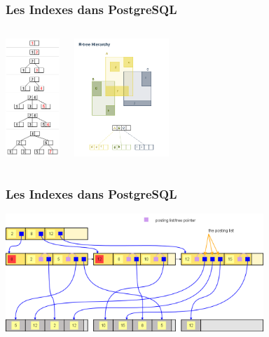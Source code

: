 \documentclass{beamer}
\begin{document}
\begin{frame}
  \frametitle{Les Indexes dans PostgreSQL}

  \begin{columns}
    \begin{center}
      \includegraphics[height=12em]{B_tree_insertion_example.png}
    \end{center}

    \begin{center}
      \includegraphics[height=12em]{rtree.png}
    \end{center}
  \end{columns}
\end{frame}

\begin{frame}
  \frametitle{Les Indexes dans PostgreSQL}

  \begin{center}
    \includegraphics[height=12em]{gin.png}
  \end{center}
\end{frame}
\end{document}
